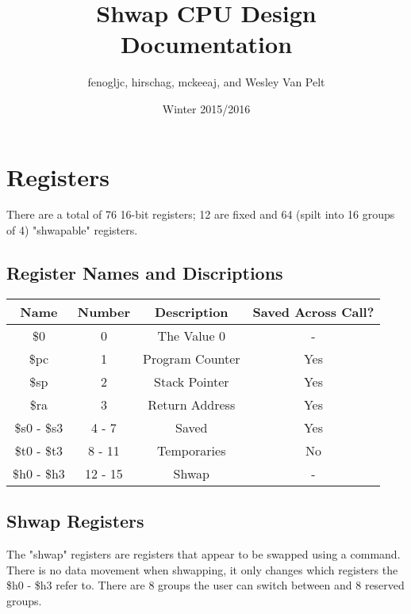 \documentclass{article}
\title{Shwap CPU Design Documentation}
\author{fenogljc, hirschag, mckeeaj, and Wesley Van Pelt}
\date{Winter 2015/2016}
\begin{document}
\maketitle
\section{Registers}
	There are a total of 76 16-bit registers; 12 are fixed and 64 (spilt into 16 groups of 4) "shwapable" registers.
	
	\subsection{Register Names and Discriptions}
		\begin{center}
			\begin{tabular}{| c | c | c | c |}
				\hline
				    Name        & Number  & Description     & Saved Across Call? \\ \hline
				    \$0         & 0       & The Value 0     & -   \\ \hline
				    \$pc        & 1       & Program Counter & Yes \\ \hline
				    \$sp        & 2       & Stack Pointer   & Yes \\ \hline
				    \$ra        & 3       & Return Address  & Yes \\ \hline
				    \$s0 - \$s3 & 4 - 7   & Saved           & Yes \\ \hline
				    \$t0 - \$t3 & 8 - 11  & Temporaries     & No  \\ \hline
				    \$h0 - \$h3 & 12 - 15 & Shwap           & -   \\ 
				\hline
			\end{tabular}
		\end{center}
	\subsection{Shwap Registers}
		The "shwap" registers are registers that appear to be swapped using a command.  There is no data movement when shwapping, it only changes which registers the \$h0 - \$h3 refer to.  There are 8 groups the user can switch between and 8 reserved groups.
\end{document}
